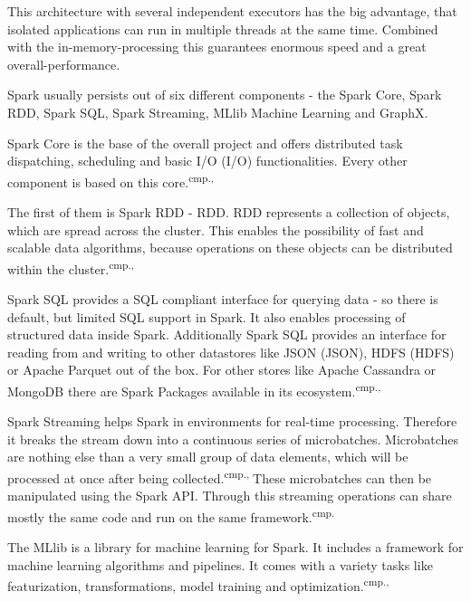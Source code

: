 This architecture with several independent executors has the big advantage, that isolated applications can run in multiple threads at the same time. Combined with the in-memory-processing this guarantees enormous speed and a great overall-performance.

Spark usually persists out of six different components - the Spark Core, Spark \acs{RDD}, Spark SQL, Spark Streaming, MLlib Machine Learning and GraphX.

Spark Core is the base of the overall project and offers distributed task dispatching, scheduling and basic \acs{I/O} (\acl{I/O}) functionalities. Every other component is based on this core.\textsuperscript{cmp.\cite{26}, \cite{28}}

The first of them is Spark RDD - \acl{RDD}. RDD represents a collection of objects, which are spread across the cluster. This enables the possibility of fast and scalable data algorithms, because operations on these objects can be distributed within the cluster.\textsuperscript{cmp.\cite{26}, \cite{28}}

Spark SQL provides a SQL compliant interface for querying data - so there is default, but limited SQL support in Spark. It also enables processing of structured data inside Spark. Additionally Spark SQL provides an interface for reading from and writing to other datastores like \acs{JSON} (\acl{JSON}), \acs{HDFS} (\acl{HDFS}) or Apache Parquet out of the box. For other stores like Apache Cassandra or MongoDB there are Spark Packages available in its ecosystem.\textsuperscript{cmp.\cite{26}, \cite{28}}

Spark Streaming helps Spark in environments for real-time processing. Therefore it breaks the stream down into a continuous series of microbatches. Microbatches are nothing else than a very small group of data elements, which will be processed at once after being collected.\textsuperscript{cmp.\cite{26}, \cite{28}}These microbatches can then be manipulated using the Spark API. Through this streaming operations can share mostly the same code and run on the same framework.\textsuperscript{cmp.\cite{27}}

The MLlib is a library for machine learning for Spark. It includes a framework for machine learning algorithms and pipelines. It comes with a variety tasks like featurization, transformations, model training and optimization.\textsuperscript{cmp.\cite{26}, \cite{28}}

